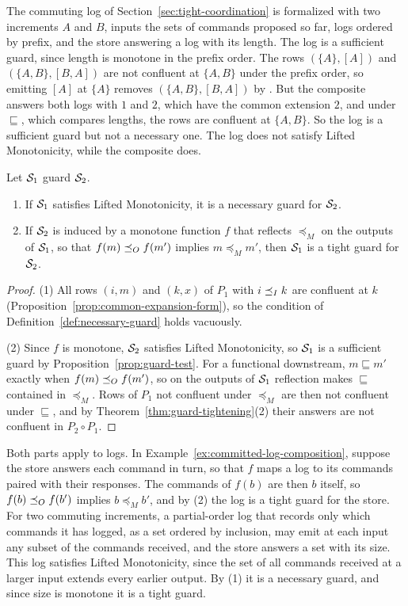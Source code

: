 The commuting log of Section~\ref{sec:tight-coordination} is formalized with
two increments $A$ and $B$, inputs the sets of commands proposed so far, logs
ordered by prefix, and the store answering a log with its length.  The
log is a sufficient guard, since length is monotone in the prefix order.  The rows
$(\{A\},[A])$ and $(\{A,B\},[B,A])$ are not confluent at $\{A,B\}$ under the
prefix order, so emitting $[A]$ at $\{A\}$ removes $(\{A,B\},[B,A])$ by
\commitment.  But the composite answers both logs with $1$ and $2$, which have
the common extension $2$, and under $\sqsubseteq$, which compares lengths, the
rows are confluent at $\{A,B\}$.  So the log is a sufficient guard but not a necessary one.  The log does
not satisfy Lifted Monotonicity, while the composite does.

\begin{proposition}
\label{prop:tight-guards}
Let $\mathcal{S}_1$ guard $\mathcal{S}_2$.
\begin{enumerate}
  \item If $\mathcal{S}_1$ satisfies Lifted Monotonicity, it is a necessary guard
        for $\mathcal{S}_2$.
  \item If $\mathcal{S}_2$ is induced by a monotone function $f$ that reflects
        $\preceq_M$ on the outputs of $\mathcal{S}_1$, so that
        $f(m)\preceq_O f(m')$ implies $m\preceq_M m'$, then $\mathcal{S}_1$ is a
        tight guard for $\mathcal{S}_2$.
\end{enumerate}
\end{proposition}

\begin{proof}
(1) All rows $(i,m)$ and $(k,x)$ of $P_1$ with $i\preceq_I k$ are
confluent at $k$ (Proposition~\ref{prop:common-expansion-form}), so the
condition of Definition~\ref{def:necessary-guard} holds vacuously.

(2) Since $f$ is monotone, $\mathcal{S}_2$ satisfies Lifted Monotonicity, so
$\mathcal{S}_1$ is a sufficient guard by Proposition~\ref{prop:guard-test}.  For a
functional downstream, $m\sqsubseteq m'$ exactly when $f(m)\preceq_O f(m')$,
so on the outputs of $\mathcal{S}_1$ reflection makes $\sqsubseteq$ contained in
$\preceq_M$.  Rows of $P_1$ not confluent under $\preceq_M$ are then
not confluent under $\sqsubseteq$, and by
Theorem~\ref{thm:guard-tightening}(2) their answers are not confluent in
$P_2\circ P_1$.
\end{proof}

Both parts apply to logs.  In Example~\ref{ex:committed-log-composition},
suppose the store answers each command in turn, so that $f$ maps a log to its
commands paired with their responses.  The commands of
$f(b)$ are then $b$ itself, so $f(b)\preceq_O f(b')$ implies $b\preceq_M b'$, and
by (2) the log is a tight guard for the store.  For two commuting increments,
a partial-order log that records only which commands it has logged, as a set
ordered by inclusion, may emit at each input any subset of the commands
received, and the store answers a set with its size.  This log satisfies
Lifted Monotonicity, since the set of all commands received at a larger input
extends every earlier output.  By (1) it is a necessary guard, and since size
is monotone it is a tight guard.



